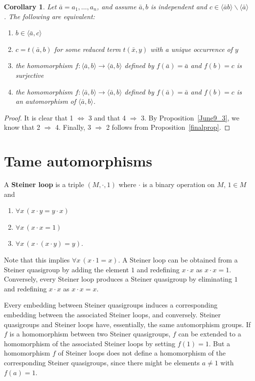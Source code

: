 \documentclass[a4paper, 11pt]{article}
\theoremstyle{note}
\newtheorem{cor}[thm]{Corollary}
\begin{document}
	
	\begin{cor}\label{July18_1} Let  $\bar{a}= a_1,\ldots,a_n$, and assume $\bar{a},b$ is independent and $c\in \langle \bar{a}b\rangle \smallsetminus \langle \bar{a}\rangle$. The following are equivalent:
	\begin{enumerate}
		\item $b\in\langle\bar{a},c\rangle$
		\item $c= t(\bar{a},b)$ for some reduced term $t(\bar{x},y)$ with a unique occurrence of $y$
		\item  the homomorphism $f:\langle \bar{a},b\rangle \rightarrow  \langle \bar{a},b\rangle$  defined by $f(\bar{a})= \bar{a}$  and  $f(b)= c$ is surjective
		\item  the homomorphism $f:\langle \bar{a},b\rangle \rightarrow  \langle \bar{a},b\rangle$  defined by $f(\bar{a})= \bar{a}$  and  $f(b)= c$ is an automorphism of $\langle \bar{a},b\rangle$.
	\end{enumerate}
\end{cor}
\begin{proof}
It is clear  that 1 $\Leftrightarrow$ 3  and that 4 $\Rightarrow$ 3.  By Proposition~\ref{June9_3}, we know that  2 $\Rightarrow$ 4.
Finally,    3 $\Rightarrow$ 2 follows from Proposition~\ref{finalprop}.

\end{proof}

\section{Tame automorphisms}

A {\bf Steiner loop} is a triple $(M,\cdot,1)$ where $\cdot$ is a binary operation on $M$, $1\in M$ and
 \begin{enumerate}
	\item $\forall x \, (x \cdot y= y\cdot x)$
	\item $\forall x \, (x\cdot x =1)$
	\item $\forall x \, (x\cdot (x\cdot y)=y)$.
\end{enumerate}
Note that this implies  $\forall x \, (x\cdot 1 =x)$.  A Steiner loop can be obtained from a Steiner quasigroup by adding the element $1$ and redefining $x\cdot x$ as $x\cdot x= 1$. Conversely, every Steiner loop produces a Steiner quasigroup by eliminating  $1$ and redefining $x\cdot x$ as $x\cdot x=x$. 

 Every embedding between Steiner quasigroups induces a corresponding embedding between the associated Steiner loops, and conversely. Steiner quasigroups and Steiner loops have, essentially, the same automorphism groups. If $f$ is a homomorphism between two Steiner quasigroups, $f$ can be extended to a homomorphism of the associated Steiner loops by setting  $f(1)=1$. But a homomorphism $f$ of Steiner loops does not define a homomorphism of the corresponding Steiner quasigroups, since there might be elements $a\neq 1$ with $f(a)=1$.
\end{document}
